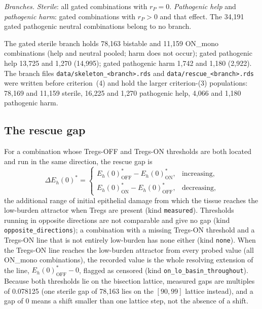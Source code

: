 \documentclass[11pt]{article}
\begin{document}
\emph{Branches.} \emph{Sterile}: all gated combinations with $r_P = 0$.
\emph{Pathogenic help} and \emph{pathogenic harm}: gated combinations with $r_P > 0$ and
that effect. The 34,191 gated pathogenic neutral combinations belong to no branch.

The gated sterile branch holds 78,163 bistable and 11,159 ON\_mono combinations (help and
neutral pooled; harm does not occur); gated pathogenic help 13,725 and 1,270 (14,995);
gated pathogenic harm 1,742 and 1,180 (2,922). The branch files
\texttt{data/skeleton\_<branch>.rds} and \texttt{data/rescue\_<branch>.rds} were written before
criterion~(4) and hold the larger criterion-(3) populations: 78,169 and 11,159 sterile,
16,225 and 1,270 pathogenic help, 4,066 and 1,180 pathogenic harm.

\subsection{The rescue gap}
\label{sec:gap}

For a combination whose Tregs-OFF and Tregs-ON thresholds are both located and run in
the same direction, the rescue gap is
\begin{equation}
\Delta E_h(0)^* = \begin{cases}
E_h(0)^*_{\mathrm{OFF}} - E_h(0)^*_{\mathrm{ON}}, & \text{increasing},\\
E_h(0)^*_{\mathrm{ON}} - E_h(0)^*_{\mathrm{OFF}}, & \text{decreasing},
\end{cases}
\label{eq:gap}
\end{equation}
the additional range of initial epithelial damage from which the tissue reaches the
low-burden attractor when Tregs are present (kind \texttt{measured}). Thresholds running
in opposite directions are not comparable and give no gap (kind
\texttt{opposite\_directions}); a combination with a missing Tregs-ON threshold and a
Tregs-ON line that is not entirely low-burden has none either (kind \texttt{none}). When
the Tregs-ON line reaches the low-burden attractor from every probed value (all ON\_mono
combinations), the recorded value is the whole resolving extension of the line,
$E_h(0)^*_{\mathrm{OFF}} - 0$, flagged as censored (kind \texttt{on\_lo\_basin\_throughout}).
Because both thresholds lie on the bisection lattice, measured gaps are multiples of
0.078125 (one sterile gap of 78,163 lies on the $[90,99]$ lattice instead), and a gap of
0 means a shift smaller than one lattice step, not the absence of a shift.
\end{document}
